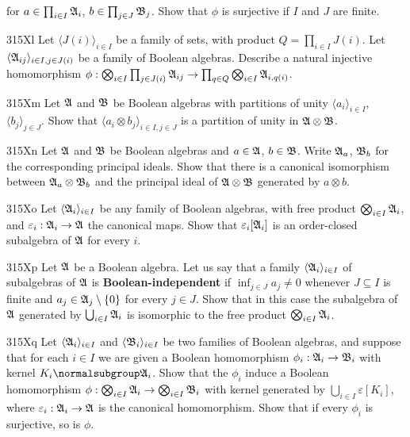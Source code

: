 {\noindent for $a\in\prod_{i\in I}\frak A_i$,
$b\in\prod_{j\in J}\frak B_j$.   Show that $\phi$ is surjective if $I$
and $J$ are finite.

\spheader 315Xl Let $\langle J(i)\rangle_{i\in I}$ be a family
of sets, with product $Q=\prod_{i\in I}J(i)$.   Let
$\langle\frak A_{ij}\rangle_{i\in I,j\in J(i)}$ be a family of Boolean
algebras.   Describe a natural injective homomorphism
$\phi:\bigotimes_{i\in I}\prod_{j\in J(i)}\frak A_{ij}
\to\prod_{q\in Q}\bigotimes_{i\in I}\frak A_{i,q(i)}$.

\spheader 315Xm Let $\frak A$ and $\frak B$ be Boolean algebras with
partitions of unity $\langle a_i\rangle_{i\in I}$,
$\langle b_j\rangle_{j\in J}$.   Show that
$\langle a_i\otimes b_j\rangle_{i\in I,j\in J}$ is a partition of unity
in $\frak A\otimes\frak B$.

\spheader 315Xn Let $\frak A$ and $\frak B$ be Boolean algebras and
$a\in\frak A$, $b\in\frak B$.   Write $\frak A_a$, $\frak B_b$ for the
corresponding principal ideals.   Show that there is a canonical
isomorphism between $\frak A_a\otimes\frak B_b$ and the principal ideal
of $\frak A\otimes\frak B$ generated by $a\otimes b$.

\spheader 315Xo Let $\langle\frak A_i\rangle_{i\in I}$ be any
family of Boolean algebras, with free product
$\bigotimes_{i\in I}\frak A_i$, and $\varepsilon_i:\frak A_i\to\frak A$
the canonical maps.   Show
that $\varepsilon_i[\frak A_i]$ is an order-closed subalgebra of
$\frak A$ for every $i$.

\spheader 315Xp Let $\frak A$ be a Boolean algebra.   Let us say
that a family $\langle\frak A_i\rangle_{i\in I}$ of subalgebras of
$\frak A$ is {\bf Boolean-independent} if $\inf_{j\in J}a_j\ne 0$
whenever $J\subseteq I$ is finite and $a_j\in\frak A_j\setminus\{0\}$
for every $j\in J$.   Show that in this case the subalgebra of $\frak A$
generated by $\bigcup_{i\in I}\frak A_i$ is isomorphic to the free
product $\bigotimes_{i\in I}\frak A_i$.

\spheader 315Xq Let $\langle\frak A_i\rangle_{i\in I}$ and
$\langle\frak B_i\rangle_{i\in I}$ be two families of Boolean algebras,
and suppose that for each $i\in I$ we are given a Boolean homomorphism
$\phi_i:\frak A_i\to\frak B_i$ with kernel
$K_i\normalsubgroup\frak A_i$.   Show that the $\phi_i$ induce a Boolean
homomorphism
$\phi:\bigotimes_{i\in I}\frak A_i\to\bigotimes_{i\in I}\frak B_i$ with
kernel generated by $\bigcup_{i\in I}\varepsilon[K_i]$, where
$\varepsilon_i:\frak A_i\to\frak A$ is the canonical homomorphism.
Show that if every $\phi_i$ is surjective, so is $\phi$.

}

